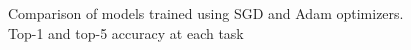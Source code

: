 \begin{figure}[H]
	\centering
    \qquad
	\caption{Comparison of models trained using SGD and Adam optimizers. Top-1 and top-5 accuracy at each task}%
	\label{fig:exp4}%
\end{figure}

